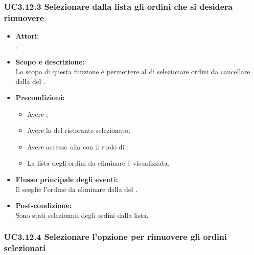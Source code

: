 \subsubsection{UC3.12.3 Selezionare dalla lista gli ordini che si desidera rimuovere} \label{UC3.12.3}

\begin{itemize}
	\item \textbf{Attori:}
	\\.
	\item \textbf{Scopo e descrizione:} 
	\\Lo scopo di questa funzione è permettere al  di selezionare ordini da cancellare dalla  del .
	\item \textbf{Precondizioni:}
	\begin{itemize}
		\item Avere ;
		\item Avere la  del ristorante selezionato;
		\item Avere accesso alla  con il ruolo di ;
		\item La lista degli ordini da eliminare è visualizzata.
	\end{itemize}
	\item \textbf{Flusso principale degli eventi:}
	\\Il {} sceglie l'ordine da eliminare dalla  del .
	\item \textbf{Post-condizione:}
	\\Sono stati selezionati degli ordini dalla lista.
\end{itemize}

\subsubsection{UC3.12.4 Selezionare l'opzione per rimuovere gli ordini selezionati} \label{UC3.12.4}

